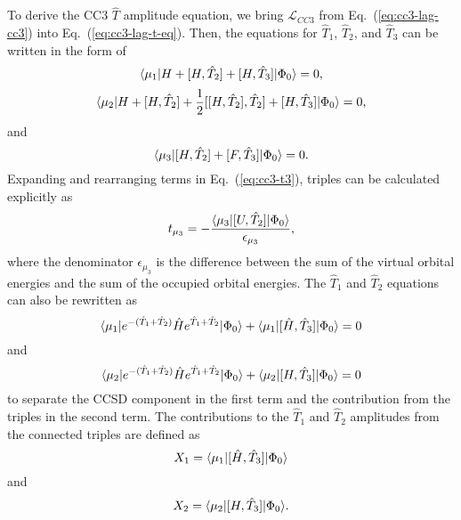 To derive the CC3 $\hat{T}$ amplitude equation, we bring $\mathcal{L}_{CC3}$ from Eq.~(\ref{eq:cc3-lag-cc3}) into Eq.~(\ref{eq:cc3-lag-t-eq}). Then, the equations for $\hat{T}_{1}$, $\hat{T}_{2}$, and $\hat{T}_{3}$ can be written in the form of
\begin{equation}
\langle\mu_{1} |H + [H, \hat{T}_{2}] + [H, \hat{T}_{3}] | \Phi_{0} \rangle=0,
\label{eq:cc3-t1}
\end{equation}
\begin{equation}
\langle\mu_{2} |H + [H, \hat{T}_{2}] + \frac{1}{2}[[H, \hat{T}_{2}], \hat{T}_{2}] + [H, \hat{T}_{3}] | \Phi_{0} \rangle=0,
\label{eq:cc3-t2}
\end{equation}
and
\begin{equation}
\langle\mu_{3} |[H, \hat{T}_{2}] + [F, \hat{T}_{3}] | \Phi_{0} \rangle=0.
\label{eq:cc3-t3}
\end{equation}
Expanding and rearranging terms in Eq.~(\ref{eq:cc3-t3}), triples can be calculated explicitly as 
\begin{equation}
t_{\mu_{3}}= -\frac{\langle\mu_{3} |[U, \hat{T}_{2}]| \Phi_{0} \rangle}{\epsilon_{\mu_{3}}},
\label{eq:cc3-final-t3}
\end{equation}
where the denominator $\epsilon_{\mu_{3}}$ is the difference between the sum of the virtual orbital energies and the sum of the occupied orbital energies. The $\hat{T}_{1}$ and $\hat{T}_{2}$ equations can also be rewritten as
\begin{equation}
\langle\mu_{1} | e^{-(\hat{T}_{1}+\hat{T}_{2})}\hat{H}e^{\hat{T}_{1}+\hat{T}_{2}}| \Phi_{0} \rangle +\langle\mu_{1} |[\hat{H}, \hat{T}_{3}] | \Phi_{0} \rangle=0
\label{eq:cc3-final-t1}
\end{equation}
and
\begin{equation}
\langle\mu_{2} | e^{-(\hat{T}_{1}+\hat{T}_{2})}\hat{H}e^{\hat{T}_{1}+\hat{T}_{2}}| \Phi_{0} \rangle +\langle\mu_{2} |[H, \hat{T}_{3}] | \Phi_{0} \rangle=0
\label{eq:cc3-final-t2}
\end{equation}
to separate the CCSD component in the first term and the contribution from the triples in the second term. The contributions to the $\hat{T}_{1}$ and  $\hat{T}_{2}$ amplitudes from the connected triples are defined as
\begin{equation}
X_{1} = \langle\mu_{1} |[\hat{H}, \hat{T}_{3}] | \Phi_{0} \rangle
\label{eq:cc3-x1}
\end{equation}
and
\begin{equation}
X_{2} = \langle\mu_{2} |[H, \hat{T}_{3}] | \Phi_{0} \rangle.
\label{eq:cc3-x2}
\end{equation}

